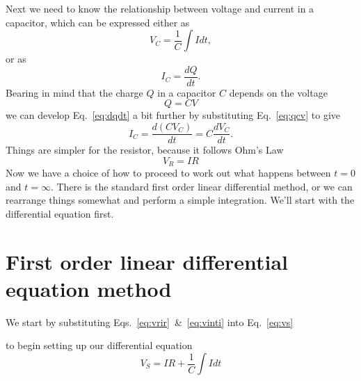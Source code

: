 \documentclass{tufte-handout}
\begin{document}
Next we need to know the relationship between voltage and current in a capacitor, which can be expressed either as
\begin{equation}
\label{eq:vinti}
V_C = \frac{1}{C}\int I dt,
\end{equation}
or as
\begin{equation}
\label{eq:dqdt}
I_C = \frac{dQ}{dt}.
\end{equation}
Bearing in mind that the charge $Q$ in a capacitor $C$ depends on the voltage
\begin{equation}
\label{eq:qcv}
Q = CV
\end{equation}
we can develop Eq.~\ref{eq:dqdt} a bit further by substituting Eq.~\ref{eq:qcv} to give
\begin{equation}
I_C = \frac{d(CV_C)}{dt} = C\frac{dV_C}{dt}.
\end{equation}
Things are simpler for the resistor, because it follows Ohm's Law
\begin{equation}
\label{eq:vrir}
V_R = IR
\end{equation}
Now we have a choice of how to proceed to work out what happens between $t=0$ and $t=\infty$.  There is the standard first order linear differential method, or we can rearrange things somewhat and perform a simple integration. We'll start with the differential equation first.

\section{First order linear differential equation method}

We start by substituting Eqs.~\ref{eq:vrir}~\&~\ref{eq:vinti} into Eq.~\ref{eq:vs}
\marginnote{\[V_C = \frac{1}{C}\int I dt\]
\[V_S = V_R + V_C \]}

 to begin setting up our differential equation
\begin{equation}
V_S = IR + \frac{1}{C}\int I dt
\end{equation}
\end{document}
